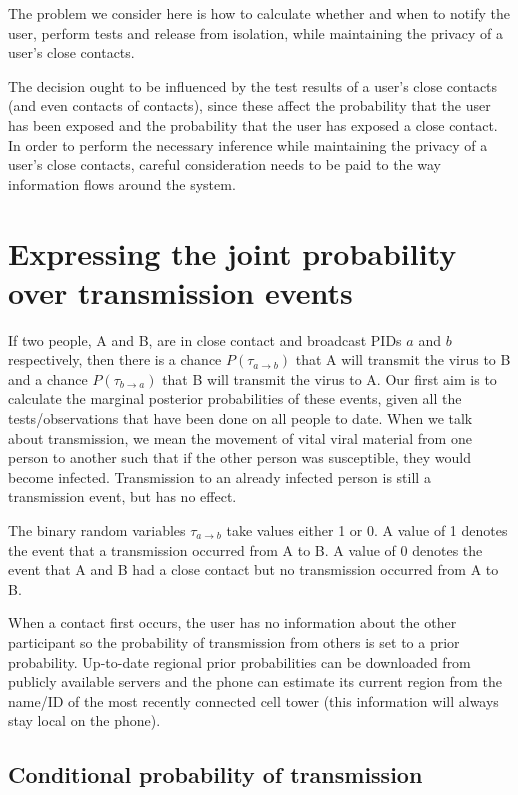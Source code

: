 \documentclass{article}
\begin{document}
The problem we consider here is how to calculate whether and when to notify the user, perform tests and release from isolation, while maintaining the privacy of a user's close contacts.

The decision ought to be influenced by the test results of a user's close contacts (and even contacts of contacts), since these affect the probability that the user has been exposed and the probability that the user has exposed a close contact. In order to perform the necessary inference while maintaining the privacy of a user's close contacts, careful consideration needs to be paid to the way information flows around the system.

\section{Expressing the joint probability over transmission events}

If two people, A and B, are in close contact and broadcast PIDs $a$ and $b$ respectively, then there is a chance $P(\tau_{a \rightarrow b})$ that A will transmit the virus to B and a chance $P(\tau_{b \rightarrow a})$ that B will transmit the virus to A. Our first aim is to calculate the marginal posterior probabilities of these events, given all the tests/observations that have been done on all people to date. When we talk about transmission, we mean the movement of vital viral material from one person to another such that if the other person was susceptible, they would become infected. Transmission to an already infected person is still a transmission event, but has no effect.

The binary random variables $\tau_{a\rightarrow b}$ take values either 1 or 0. A value of 1 denotes the event that a transmission occurred from A to B. A value of 0 denotes the event that A and B had a close contact but no transmission occurred from A to B.

When a contact first occurs, the user has no information about the other participant so the probability of transmission from others is set to a prior probability. Up-to-date regional prior probabilities can be downloaded from publicly available servers and the phone can estimate its current region from the name/ID of the most recently connected cell tower (this information will always stay local on the phone).

\subsection{Conditional probability of transmission}
\end{document}
